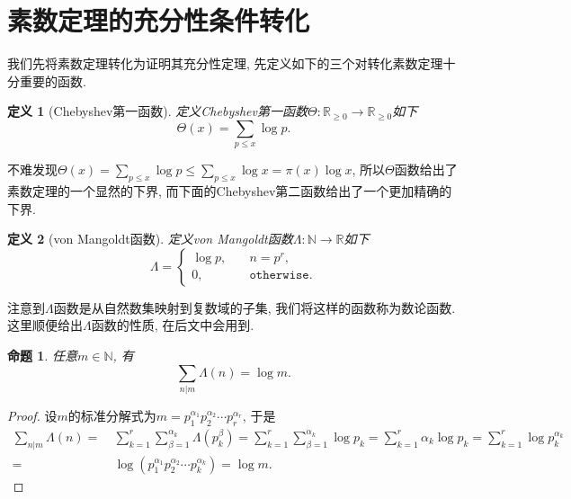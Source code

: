 \documentclass[12pt, a4paper, oneside]{ctexart}
\newtheorem{definition}{定义}[section]
\newtheorem{proposition}{命题}[section]
\numberwithin{equation}{section}  %
\let\leq=\leqslant %
\let\geq=\geqslant %
\def\R{\mathbb{R}}          %
\def\N{\mathbb{N}}          %
\begin{document}
\section{素数定理的充分性条件转化}
我们先将素数定理转化为证明其充分性定理, 先定义如下的三个对转化素数定理十分重要的函数.
\begin{definition}[Chebyshev第一函数]
    定义Chebyshev第一函数$\Theta:\R_{\geq 0}\to \R_{\geq 0}$如下
    \begin{equation*}
        \Theta(x) = \sum_{p\leq x}\log p.
    \end{equation*}
\end{definition}
不难发现$\Theta(x) = \sum_{p\leq x}\log p\leq \sum_{p\leq x}\log x = \pi(x)\log x$, 所以$\Theta$函数给出了素数定理的一个显然的下界, 而下面的Chebyshev第二函数给出了一个更加精确的下界.
\begin{definition}[von Mangoldt函数]
    定义von Mangoldt函数$\Lambda:\N\to\R$如下
    \begin{equation*}
        \Lambda = \begin{cases}
            \log p,&\quad n=p^r,\\
            0,&\quad \mathtt{otherwise}.
        \end{cases}
    \end{equation*}
\end{definition}
注意到$\Lambda$函数是从自然数集映射到复数域的子集, 我们将这样的函数称为$\textbf{数论函数}$. 这里顺便给出$\Lambda$函数的性质, 在后文中会用到.
\begin{proposition}\label{prop-lambda}
    任意$m\in \N$, 有
    \begin{equation*}
        \sum_{n|m}\Lambda(n) = \log m.
    \end{equation*}
\end{proposition}
\begin{proof}
    设$m$的标准分解式为$m = p_1^{\alpha_1}p_2^{\alpha_2}\cdots p_r^{\alpha_r}$, 于是
    \begin{equation*}
        \begin{aligned}
            \sum_{n|m}\Lambda(n) =&\ \sum_{k=1}^r\sum_{\beta=1}^{\alpha_k}\Lambda(p_k^{\beta}) = \sum_{k=1}^r\sum_{\beta=1}^{\alpha_k}\log p_k = \sum_{k=1}^r\alpha_k\log p_k = \sum_{k=1}^r\log p_k^{\alpha_k}\\
            =&\ \log(p_1^{\alpha_1}p_2^{\alpha_2}\cdots p_k^{\alpha_k}) = \log m.
        \end{aligned}
    \end{equation*}
\end{proof}
\end{document}
